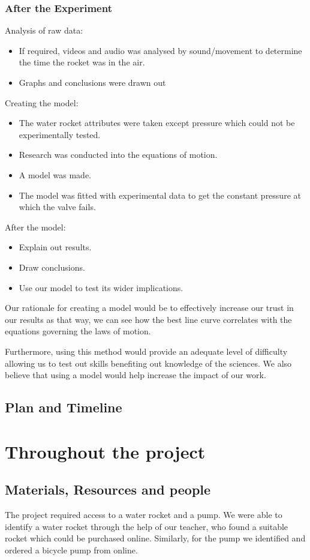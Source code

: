 \documentclass[14pt]{article}
\begin{document}
\subsubsection{After the Experiment}
Analysis of raw data:
\begin{itemize}
    \item If required, videos and audio was analysed by sound/movement to determine the time the rocket was in the air.
    \item Graphs and conclusions were drawn out
\end{itemize}
Creating the model:
\begin{itemize}
    \item The water rocket attributes were taken except pressure which could not be experimentally tested.
    \item Research was conducted into the equations of motion.
    \item A model was made.
    \item The model was fitted with experimental data to get the constant pressure at which the valve fails.
\end{itemize}
After the model:
\begin{itemize}
    \item Explain out results.
    \item Draw conclusions.
    \item Use our model to test its wider implications.
\end{itemize}
Our rationale for creating a model would be to effectively increase our trust in our results as that way, we can see how the best line curve correlates with the equations governing the laws of motion.

Furthermore, using this method would provide an adequate level of difficulty allowing us to test out skills benefiting out knowledge of the sciences. We also believe that using a model would help increase the impact of our work.
\subsection{Plan and Timeline}
\section{Throughout the project}
\subsection{Materials, Resources and people}
The project required access to a water rocket and a pump. We were able to identify a water rocket through the help of our teacher, who found
a suitable rocket which could be purchased online. Similarly, for the pump we identified and ordered a bicycle pump from online.
\end{document}
